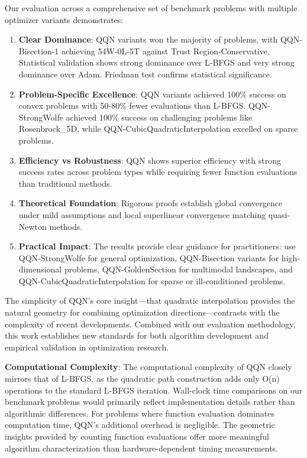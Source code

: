 Our evaluation across a comprehensive set of benchmark problems with multiple optimizer variants demonstrates:

\begin{enumerate}
\def\labelenumi{\arabic{enumi}.}
\item
  \textbf{Clear Dominance}: QQN variants won the majority of problems, with QQN-Bisection-1 achieving 54W-0L-5T against Trust Region-Conservative. Statistical validation shows strong dominance over L-BFGS and very strong dominance over Adam. Friedman test confirms statistical significance.
\item
  \textbf{Problem-Specific Excellence}: QQN variants achieved 100\% success on convex problems with 50-80\% fewer evaluations than L-BFGS. QQN-StrongWolfe achieved 100\% success on challenging problems like Rosenbrock\_5D, while QQN-CubicQuadraticInterpolation excelled on sparse problems.
\item
  \textbf{Efficiency vs Robustness}: QQN shows superior efficiency with strong success rates across problem types while requiring fewer function evaluations than traditional methods.
\item
  \textbf{Theoretical Foundation}: Rigorous proofs establish global convergence under mild assumptions and local superlinear convergence matching quasi-Newton methods.
\item
  \textbf{Practical Impact}: The results provide clear guidance for practitioners: use QQN-StrongWolfe for general optimization, QQN-Bisection variants for high-dimensional problems, QQN-GoldenSection for multimodal landscapes, and QQN-CubicQuadraticInterpolation for sparse or ill-conditioned problems.
\end{enumerate}

The simplicity of QQN's core insight---that quadratic interpolation provides the natural geometry for combining optimization directions---contrasts with the complexity of recent developments.
Combined with our evaluation methodology, this work establishes new standards for both algorithm development and empirical validation in optimization research.

\textbf{Computational Complexity}: The computational complexity of QQN closely mirrors that of L-BFGS, as the quadratic path construction adds only O(n) operations to the standard L-BFGS iteration.
Wall-clock time comparisons on our benchmark problems would primarily reflect implementation details rather than algorithmic differences.
For problems where function evaluation dominates computation time, QQN's additional overhead is negligible.
The geometric insights provided by counting function evaluations offer more meaningful algorithm characterization than hardware-dependent timing measurements.

